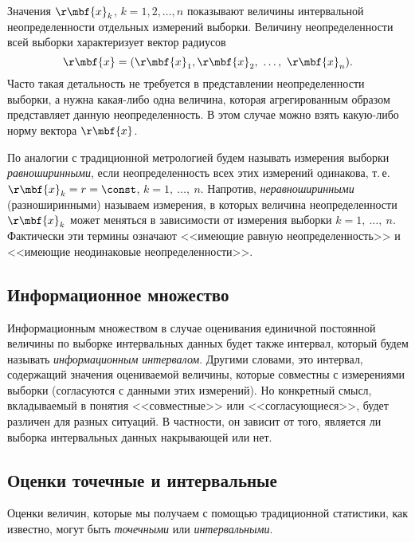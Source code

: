 \documentclass[a5paper,openany]{book}
\begin{document}
Значения $\r\mbf{x}_k$, $k = 1,2,\ldots,n$ показывают величины интервальной 
неопределенности отдельных измерений выборки. Величину 
неопределенности всей выборки характеризует вектор радиусов 
\begin{equation*}
\r\mbf{x} = (\r\mbf{x}_{1}, \r\mbf{x}_{2}, \ \ldots, \ \r\mbf{x}_{n}).
\end{equation*} 
Часто такая детальность не требуется  в представлении неопределенности выборки, 
а нужна какая-либо одна величина, которая агрегированным образом представляет данную 
неопределенность. В этом случае можно взять какую-либо норму вектора $\r\mbf{x}$.

По аналогии с традиционной метрологией будем называть измерения выборки 
\textit{равноширинными}, если неопределенность всех этих измерений одинакова, т.\,е. 
$\r\mbf{x}_k = r = \const$, $k = 1, \ \ldots, \ n$. Напротив, \textit{неравноширинными} 
(разноширинными) называем измерения, в которых величина неопределенности $\r\mbf{x}_k$ 
может меняться в зависимости от измерения выборки $k = 1, \ \ldots, \ n$. Фактически эти 
термины  означают  <<имеющие равную неопределенность>>  и  <<имеющие неодинаковые 
неопределенности>>.  



\subsection{Информационное множество} 
\label{InfoSetSect}

Информационным множеством в случае оценивания единичной постоянной величины по выборке 
интервальных данных будет также интервал, который будем называть \emph{информационным 
интервалом}. Другими словами, это интервал, содержащий значения оцениваемой величины, 
которые совместны с измерениями выборки (согласуются с данными этих измерений). 
Но конкретный смысл, вкладываемый в понятия <<совместные>> или <<согласующиеся>>, будет 
различен для разных ситуаций. В частности, он зависит от того, является ли выборка  
интервальных данных накрывающей или нет. 

\subsection{Оценки точечные и интервальные} 
\label{EstPointInte}

Оценки величин, которые мы получаем с помощью традиционной статистики, как известно, 
могут быть \emph{точечными} или \emph{интервальными}. 
\end{document}
